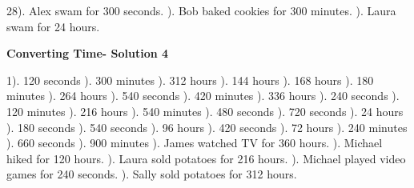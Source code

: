 \documentclass{article}%
\begin{document}
28). Alex swam for 300 seconds.%
). Bob baked cookies for 300 minutes.%
). Laura swam for 24 hours.%
\newline%
\newpage%
\large%
\begin{center}%
\textbf{Converting Time- Solution 4}%
\newline%
\end{center} \normalsize%
1). 120 seconds%
). 300 minutes%
). 312 hours%
). 144 hours%
). 168 hours%
). 180 minutes%
). 264 hours%
). 540 seconds%
). 420 minutes%
). 336 hours%
). 240 seconds%
). 120 minutes%
). 216 hours%
). 540 minutes%
). 480 seconds%
). 720 seconds%
). 24 hours%
). 180 seconds%
). 540 seconds%
). 96 hours%
). 420 seconds%
). 72 hours%
). 240 minutes%
). 660 seconds%
). 900 minutes%
). James watched TV for 360 hours.%
). Michael hiked for 120 hours.%
). Laura sold potatoes for 216 hours.%
). Michael played video games for 240 seconds.%
). Sally sold potatoes for 312 hours.%
\newline%
\newpage%
\end{document}
